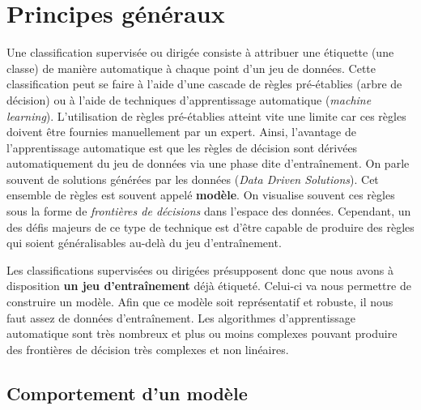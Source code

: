 \documentclass[
  french,
  11pt,
  letterpaper,
  open=any,
  twoside=false,
  french]{scrbook}
\begin{document}
\section{Principes généraux}\label{principes-guxe9nuxe9raux}

Une classification supervisée ou dirigée consiste à attribuer une
étiquette (une classe) de manière automatique à chaque point d'un jeu de
données. Cette classification peut se faire à l'aide d'une cascade de
règles pré-établies (arbre de décision) ou à l'aide de techniques
d'apprentissage automatique (\emph{machine learning}). L'utilisation de
règles pré-établies atteint vite une limite car ces règles doivent être
fournies manuellement par un expert. Ainsi, l'avantage de
l'apprentissage automatique est que les règles de décision sont dérivées
automatiquement du jeu de données via une phase dite d'entraînement. On
parle souvent de solutions générées par les données (\emph{Data Driven
Solutions}). Cet ensemble de règles est souvent appelé \textbf{modèle}.
On visualise souvent ces règles sous la forme de \emph{frontières de
décisions} dans l'espace des données. Cependant, un des défis majeurs de
ce type de technique est d'être capable de produire des règles qui
soient généralisables au-delà du jeu d'entraînement.

Les classifications supervisées ou dirigées présupposent donc que nous
avons à disposition \textbf{un jeu d'entraînement} déjà étiqueté.
Celui-ci va nous permettre de construire un modèle. Afin que ce modèle
soit représentatif et robuste, il nous faut assez de données
d'entraînement. Les algorithmes d'apprentissage automatique sont très
nombreux et plus ou moins complexes pouvant produire des frontières de
décision très complexes et non linéaires.

\subsection{Comportement d'un modèle}\label{comportement-dun-moduxe8le}
\end{document}
